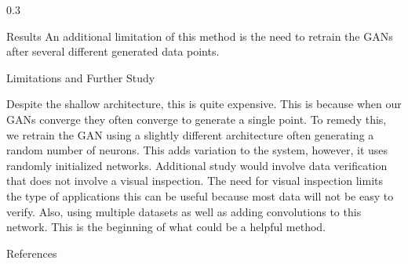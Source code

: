 \documentclass{msuposter}
\newcommand{\colwidth}{0.3\linewidth}
\begin{document}
\begin{frame}{}
\begin{columns}[t]
\begin{column}{\colwidth}
\begin{block}{Results}
An additional limitation of this method is the need to retrain the GANs after several different generated data points.
\end{block}


\begin{block}{Limitations and Further Study}

Despite the shallow architecture, this is quite expensive. This is because when our GANs converge they often converge to generate a single point. To remedy this, we retrain the GAN using a slightly different architecture often generating a random number of neurons. This adds variation to the system, however, it uses randomly initialized networks. Additional study would involve data verification that does not involve a visual inspection. The need for visual inspection limits the type of applications this can be useful because most data will not be easy to verify. Also, using multiple datasets as well as adding convolutions to this network. This is the beginning of what could be a helpful method. 

\end{block}

\begin{block}{References}
\scriptsize


\end{block}

\end{column}

\end{columns}
	\end{frame}
\end{document}
